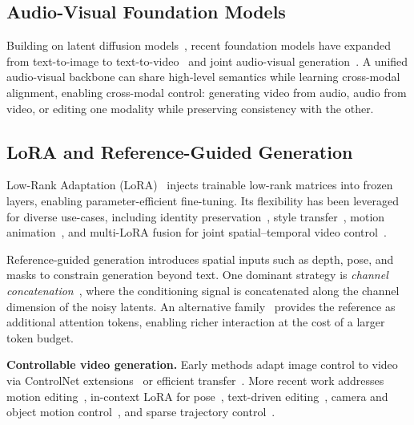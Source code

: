 \subsection{Audio-Visual Foundation Models}
Building on latent diffusion models~\cite{rombach2022latentdiffusion}, recent foundation models have expanded from text-to-image to text-to-video~\cite{blattmann2023stablevideodiffusion,hacohen2025ltxv,yang2025cogvideox} and joint audio-visual generation~\cite{polyak2024moviegen}. A unified audio-visual backbone can share high-level semantics while learning cross-modal alignment, enabling cross-modal control: generating video from audio, audio from video, or editing one modality while preserving consistency with the other.

\subsection{LoRA and Reference-Guided Generation}
Low-Rank Adaptation (LoRA)~\cite{hu2022lora} injects trainable low-rank matrices into frozen layers, enabling parameter-efficient fine-tuning. Its flexibility has been leveraged for diverse use-cases, including identity preservation~\cite{ruiz2023dreambooth}, style transfer~\cite{sohn2023styledrop}, motion animation~\cite{guo2024animatediff}, and multi-LoRA fusion for joint spatial--temporal video control~\cite{zhang2025lionlora}.

Reference-guided generation introduces spatial inputs such as depth, pose, and masks to constrain generation beyond text. One dominant strategy is \emph{channel concatenation}~\cite{brooks2023instructpix2pix}, where the conditioning signal is concatenated along the channel dimension of the noisy latents. An alternative family~\cite{batifol2025fluxkontext,zhang2026omnitransfer} provides the reference as additional attention tokens, enabling richer interaction at the cost of a larger token budget.

\textbf{Controllable video generation.}
Early methods adapt image control to video via ControlNet extensions~\cite{zhao2023controlvideo,zhang2023controlvideo,chen2023controlavideo} or efficient transfer~\cite{cho2025ctrladapter,wang2024easycontrol,peng2024controlnext}. More recent work addresses motion editing~\cite{burgert2025motionv2v}, in-context LoRA for pose~\cite{he2025posegen}, text-driven editing~\cite{liu2023videop2p,liew2023magicedit}, camera and object motion control~\cite{wang2023motionctrl}, and sparse trajectory control~\cite{wang2025ati}.

